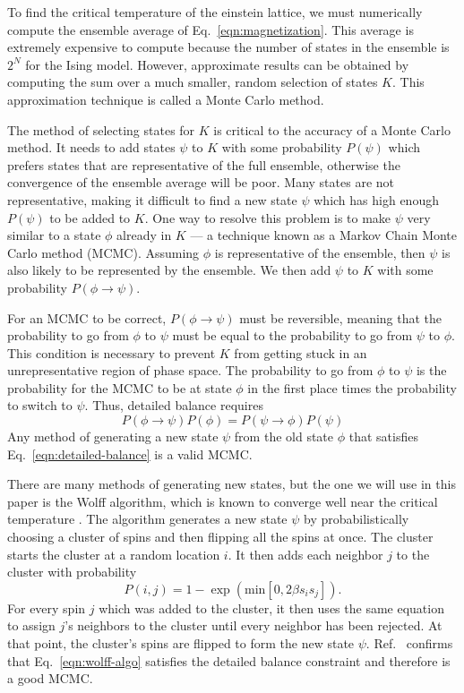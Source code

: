 \documentclass[
  amsmath,
  amssymb,
  aps,
  twocolumn,
  nofootinbib,
  nolongbibliography,
  floatfix,
]{revtex4-2}
\newcommand{\parens}[1]{\left ( #1 \right )}
\begin{document}
To find the critical temperature of the einstein lattice, we must numerically compute the ensemble average of Eq.~\ref{eqn:magnetization}. This average is extremely expensive to compute because the number of states in the ensemble is $2^N$ for the Ising model. However, approximate results can be obtained by computing the sum over a much smaller, random selection of states $K$. This approximation technique is called a Monte Carlo method.

The method of selecting states for $K$ is critical to the accuracy of a Monte Carlo method. It needs to add states $\psi$ to $K$ with some probability $P(\psi)$ which prefers states that are representative of the full ensemble, otherwise the convergence of the ensemble average will be poor. Many states are not representative, making it difficult to find a new state $\psi$ which has high enough $P(\psi)$ to be added to $K$. One way to resolve this problem is to make $\psi$ very similar to a state $\phi$ already in $K$ --- a technique known as a Markov Chain Monte Carlo method (MCMC). Assuming $\phi$ is representative of the ensemble, then $\psi$ is also likely to be represented by the ensemble. We then add $\psi$ to $K$ with some probability $P(\phi \rightarrow \psi)$.

For an MCMC to be correct, $P(\phi \rightarrow \psi)$ must be reversible, meaning that the probability to go from $\phi$ to $\psi$ must be equal to the probability to go from $\psi$ to $\phi$. This condition is necessary to prevent $K$ from getting stuck in an unrepresentative region of phase space. The probability to go from $\phi$ to $\psi$ is the probability for the MCMC to be at state $\phi$ in the first place times the probability to switch to $\psi$. Thus, detailed balance requires
\begin{equation}
  P(\phi \rightarrow \psi)P(\phi) = P(\psi \rightarrow \phi)P(\psi)
  \label{eqn:detailed-balance}
\end{equation}
Any method of generating a new state $\psi$ from the old state $\phi$ that satisfies Eq.~\ref{eqn:detailed-balance} is a valid MCMC.

There are many methods of generating new states, but the one we will use in this paper is the Wolff algorithm, which is known to converge well near the critical temperature \cite{wolff1989collective}. The algorithm generates a new state $\psi$ by probabilistically choosing a cluster of spins and then flipping all the spins at once. The cluster starts the cluster at a random location $i$. It then adds each neighbor $j$ to the cluster with probability
\begin{equation}
  P(i,j) = 1 - \exp\parens{\mathrm{min}\left[0, 2\beta s_i s_j \right]}.
  \label{eqn:wolff-algo}
\end{equation}
For every spin $j$ which was added to the cluster, it then uses the same equation to assign $j$'s neighbors to the cluster until every neighbor has been rejected. At that point, the cluster's spins are flipped to form the new state $\psi$. Ref.~\cite{wolff1989collective} confirms that Eq.~\ref{eqn:wolff-algo} satisfies the detailed balance constraint and therefore is a good MCMC.
\end{document}
